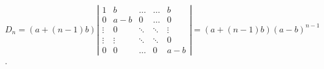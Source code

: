{\begin{enumerate}
{\begin{center}
$D_n=(a+(n-1)b)\left|
\begin{array}{ccccc}
1&b&\ldots&\ldots&b\\
0&a-b&0&\ldots&0\\
\vdots&0&\ddots&\ddots&\vdots\\
\vdots&\vdots&\ddots&\ddots&0\\
0&0&\ldots&0&a-b
\end{array}
\right|=(a+(n-1)b)(a-b)^{n-1}$.
\end{center}

\begin{center}
\end{center}}
\end{enumerate}
}